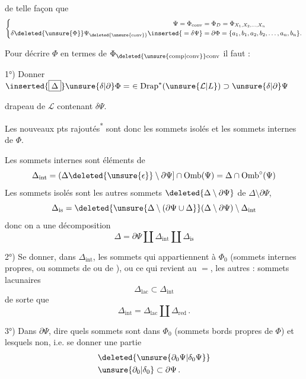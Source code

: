de telle façon que
\[
\left\{\begin{aligned}
\Psi=\Phi_{\mathrm{conv}}&=\Phi_D=\Phi_{X_1,X_2,\ldots,X_n}\\
\delta\deleted{\unsure{\Phi}}\Psi_{\deleted{\unsure{\mathrm{conv}}}}\inserted{{}=\delta\Psi}&=\partial\Phi=\{a_1,b_1,a_2,b_2,\ldots,a_n,b_n\}.
\end{aligned}\right.
\]

Pour  décrire $\Phi$ en termes de $\Phi_{\deleted{\unsure{\mathrm{comp}|\mathrm{conv}}}\mathrm{conv}}$ il faut :

1°) Donner $\inserted{\boxed{\Delta}}\unsure{\delta|\partial}\Phi=\ \in\mathrm{Drap}^{*}(\unsure{\mathcal{L}|L})\supset\unsure{\delta|\partial}\Psi$

\hspace*{1em}drapeau de $\mathcal{L}$ contenant $\delta\Psi$.

Les nouveaux pts rajoutés\textsuperscript{*} sont donc  les  sommets isolés et les sommets internes de $\Phi$.


Les sommets  internes sont  éléments de
\[
\Delta_{\mathrm{int}}=(\Delta\deleted{\unsure{\epsilon}}\setminus\partial\Psi]\cap\mathrm{Omb}(\Psi)=\Delta\cap\mathrm{Omb}^{\circ}(\Psi)
\]
Les sommets isolés sont  les autres sommets $\deleted{\Delta\setminus\partial\Psi}$ de $\Delta\setminus\partial\Psi$,
\[
\Delta_{\mathrm{is}}=\deleted{\unsure{\Delta\setminus(\partial\Psi\cup\Delta}}(\Delta\setminus\partial\Psi)\setminus\Delta_{\mathrm{int}}
\]
donc on a une décomposition
\[
\Delta=\partial\Psi\amalg\Delta_{\mathrm{int}}\amalg\Delta_{\mathrm{is}}
\]

2°) Se donner, dans $\Delta_{\mathrm{int}}$, les sommets qui appartiennent à $\Phi_0$ (sommets internes propres, ou sommets de  ou de ), ou ce qui revient au $=$, les autres :  sommets lacunaires
\[
\boxed{\Delta_{\mathrm{lac}}}\subset\Delta_{\mathrm{int}}
\]
de sorte que
\[
\Delta_{\mathrm{int}}=\Delta_{\mathrm{lac}}\amalg\Delta_{\mathrm{red}}\,.
\]

3°) Dans $\partial\Psi$\inserted{$(=\partial\Phi)$}, dire quels sommets sont dans $\Phi_0$  (sommets bords propres de $\Phi$) et lesquels non, i.e. se donner une partie
\[
\begin{aligned}
&\deleted{\unsure{\partial_0\Psi|\delta_0\Psi}}\\
&\unsure{\partial_0|\delta_0}\subset\partial\Psi\,.
\end{aligned}
\]

